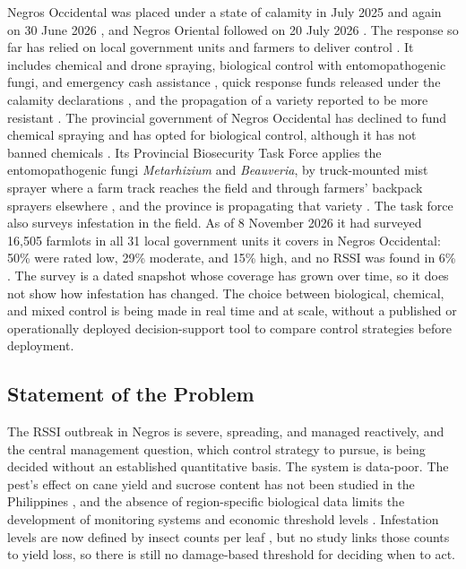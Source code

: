 Negros Occidental was placed under a state of calamity in July 2025 \citep{Masculino2025} and again on 30 June 2026 \citep{Bayoran2026}, and Negros Oriental followed on 20 July 2026 \citep{Partlow2026}. The response so far has relied on local government units and farmers to deliver control \citep{Partlow2026,Gomez2026}. It includes chemical and drone spraying, biological control with entomopathogenic fungi, and emergency cash assistance \citep{ChiniMandi2026}, quick response funds released under the calamity declarations \citep{Partlow2026}, and the propagation of a variety reported to be more resistant \citep{Gomez2026}. The provincial government of Negros Occidental has declined to fund chemical spraying and has opted for biological control, although it has not banned chemicals \citep{Bayoran2026}. Its Provincial Biosecurity Task Force applies the entomopathogenic fungi \emph{Metarhizium} and \emph{Beauveria}, by truck-mounted mist sprayer where a farm track reaches the field and through farmers' backpack sprayers elsewhere \citep{PGNO2026}, and the province is propagating that variety \citep{Gomez2026}. The task force also surveys infestation in the field. As of 8 November 2026 it had surveyed 16,505 farmlots in all 31 local government units it covers in Negros Occidental: 50\% were rated low, 29\% moderate, and 15\% high, and no RSSI was found in 6\% \citep{PGNO2026}. The survey is a dated snapshot whose coverage has grown over time, so it does not show how infestation has changed. The choice between biological, chemical, and mixed control is being made in real time and at scale, without a published or operationally deployed decision-support tool to compare control strategies before deployment.

\subsection{Statement of the Problem}

The RSSI outbreak in Negros is severe, spreading, and managed reactively, and the central management question, which control strategy to pursue, is being decided without an established quantitative basis. The system is data-poor. The pest's effect on cane yield and sucrose content has not been studied in the Philippines \citep{Guerrero2024}, and the absence of region-specific biological data limits the development of monitoring systems and economic threshold levels \citep{Guerrero2026}. Infestation levels are now defined by insect counts per leaf \citep{PGNO2026}, but no study links those counts to yield loss, so there is still no damage-based threshold for deciding when to act.

